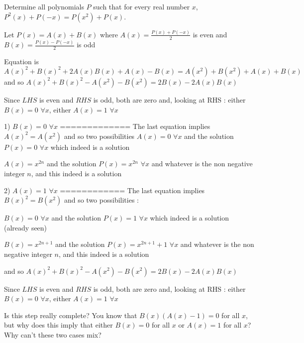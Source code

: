 \begin{solution}
	\begin{tcolorbox}Determine all polynomials $P$ such that for every real number $x$,  $P^2(x)+P(-x)=P(x^2)+P(x)$.\end{tcolorbox}
Let $P(x)=A(x)+B(x)$ where $A(x)=\frac{P(x)+P(-x)}2$ is even and $B(x)=\frac{P(x)-P(-x)}2$ is odd

Equation is $A(x)^2+B(x)^2+2A(x)B(x)+A(x)-B(x)=A(x^2)+B(x^2)+A(x)+B(x)$ and so $A(x)^2+B(x)^2-A(x^2)-B(x^2)=2B(x)-2A(x)B(x)$

Since $LHS$ is even and $RHS$ is odd, both are zero and, looking at RHS : either $B(x)=0$ $\forall x$, either $A(x)=1$ $\forall x$

1) $B(x)=0$ $\forall x$
=============
The last equation implies $A(x)^2=A(x^2)$ and so two possibilities
$A(x)=0$ $\forall x$ and the solution $\boxed{P(x)=0}$ $\forall x$ which indeed is a solution

$A(x)=x^{2n}$ and the solution $\boxed{P(x)=x^{2n}}$ $\forall x$ and whatever is the non negative integer $n$, and this indeed is a solution

2) $A(x)=1$ $\forall x$
============
The last equation implies $B(x)^2=B(x^2)$ and so two possibilities :

$B(x)=0$ $\forall x$ and the solution $\boxed{P(x)=1}$ $\forall x$ which indeed is a solution (already seen)

$B(x)=x^{2n+1}$ and the solution $\boxed{P(x)=x^{2n+1}+1}$ $\forall x$ and whatever is the non negative integer $n$, and this indeed is a solution
\end{solution}



\begin{solution}
	\begin{tcolorbox}and so $A(x)^2+B(x)^2-A(x^2)-B(x^2)=2B(x)-2A(x)B(x)$

Since $LHS$ is even and $RHS$ is odd, both are zero and, looking at RHS : either $B(x)=0$ $\forall x$, either $A(x)=1$ $\forall x$\end{tcolorbox}
Is this step really complete?
You know that $B(x)\left(A(x)-1\right)=0$ for all $x$, but why does this imply that either $B(x)=0$ for all $x$ or $A(x)=1$ for all $x$?
Why can't these two cases mix?
\end{solution}



